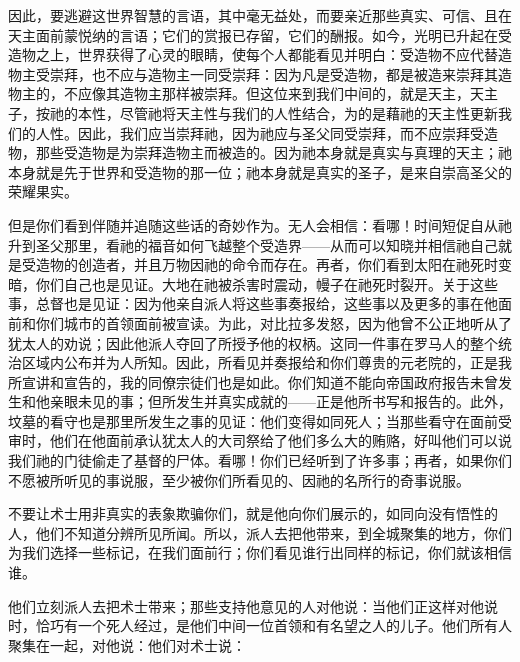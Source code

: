 因此，要逃避这世界智慧的言语，其中毫无益处，而要亲近那些真实、可信、且在天主面前蒙悦纳的言语；它们的赏报已存留，它们的酬报。如今，光明已升起在受造物之上，世界获得了心灵的眼睛，使每个人都能看见并明白：受造物不应代替造物主受崇拜，也不应与造物主一同受崇拜：因为凡是受造物，都是被造来崇拜其造物主的，不应像其造物主那样被崇拜。但这位来到我们中间的，就是天主，天主子，按祂的本性，尽管祂将天主性与我们的人性结合，为的是藉祂的天主性更新我们的人性。因此，我们应当崇拜祂，因为祂应与圣父同受崇拜，而不应崇拜受造物，那些受造物是为崇拜造物主而被造的。因为祂本身就是真实与真理的天主；祂本身就是先于世界和受造物的那一位；祂本身就是真实的圣子，是来自崇高圣父的荣耀果实。\par

但是你们看到伴随并追随这些话的奇妙作为。无人会相信：看哪！时间短促自从祂升到圣父那里，看祂的福音如何飞越整个受造界——从而可以知晓并相信祂自己就是受造物的创造者，并且万物因祂的命令而存在。再者，你们看到太阳在祂死时变暗，你们自己也是见证。大地在祂被杀害时震动，幔子在祂死时裂开。关于这些事，总督也是见证：因为他亲自派人将这些事奏报给，这些事以及更多的事在他面前和你们城市的首领面前被宣读。为此，对比拉多发怒，因为他曾不公正地听从了犹太人的劝说；因此他派人夺回了所授予他的权柄。这同一件事在罗马人的整个统治区域内公布并为人所知。因此，所看见并奏报给和你们尊贵的元老院的，正是我所宣讲和宣告的，我的同僚宗徒们也是如此。你们知道不能向帝国政府报告未曾发生和他亲眼未见的事；但所发生并真实成就的——正是他所书写和报告的。此外，坟墓的看守也是那里所发生之事的见证：他们变得如同死人；当那些看守在面前受审时，他们在他面前承认犹太人的大司祭给了他们多么大的贿赂，好叫他们可以说我们祂的门徒偷走了基督的尸体。看哪！你们已经听到了许多事；再者，如果你们不愿被所听见的事说服，至少被你们所看见的、因祂的名所行的奇事说服。\par

不要让术士用非真实的表象欺骗你们，就是他向你们展示的，如同向没有悟性的人，他们不知道分辨所见所闻。所以，派人去把他带来，到全城聚集的地方，你们为我们选择一些标记，在我们面前行；你们看见谁行出同样的标记，你们就该相信谁。\par

他们立刻派人去把术士带来；那些支持他意见的人对他说：当他们正这样对他说时，恰巧有一个死人经过，是他们中间一位首领和有名望之人的儿子。他们所有人聚集在一起，对他说：他们对术士说：\par

